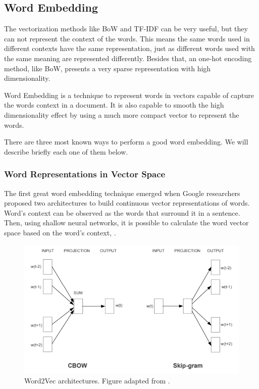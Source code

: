 	\subsection{Word Embedding}

	The vectorization methods like BoW and TF-IDF can be very useful, but they can not represent the context of the words. This means the same words used in different contexts have the same representation, just as different words used with the same meaning are represented differently. Besides that, an one-hot encoding method, like BoW, presents a very sparse representation with high dimensionality.

	Word Embedding is a technique to represent words in vectors capable of capture the words context in a document. It is also capable to smooth the high dimensionality effect by using a much more compact vector to represent the words.

	There are three most known ways to perform a good word embedding. We will describe briefly each one of them below.

	\subsubsection{Word Representations in Vector Space}

	The first great word embedding technique emerged when Google researchers proposed two architectures to build continuous vector representations of words. Word's context can be observed as the words that surround it in a sentence. Then, using shallow neural networks, it is possible to calculate the word vector space based on the word's context, \cite{mikolov2013efficient}.

	\begin{figure}[h!]
		\centering
		\includegraphics[width=0.8\linewidth]{01.Chapters/02.Background/word2vec_architectures}
		\caption{Word2Vec architectures. Figure adapted from  .}
		\label{fig:word2vecarchitectures}
	\end{figure}

